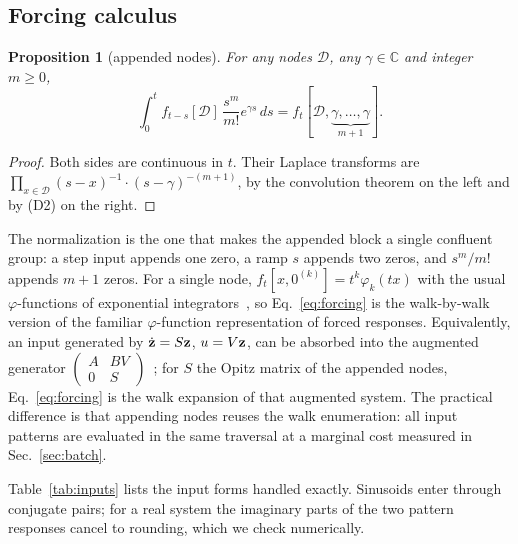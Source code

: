 \documentclass[aps,pra,superscriptaddress,floatfix,longbibliography,twocolumn]{revtex4-2}
\newcommand{\bz}{{\bf z}}
\newtheorem{proposition}{Proposition}
\begin{document}
\subsection{Forcing calculus}
\begin{proposition}[appended nodes]\label{prop:forcing}
For any nodes $\mathcal{D}$, any $\gamma\in\mathbb{C}$ and integer $m\ge0$,
\begin{equation}\label{eq:forcing}
\int_0^t f_{t-s}[\mathcal{D}]\,\frac{s^m}{m!}e^{\gamma s}\,ds=f_t[\mathcal{D},\underbrace{\gamma,\dots,\gamma}_{m+1}].
\end{equation}
\end{proposition}
\begin{proof}
Both sides are continuous in $t$. Their Laplace transforms are $\prod_{x\in\mathcal{D}}(s-x)^{-1}\cdot(s-\gamma)^{-(m+1)}$, by the convolution theorem on the left and by (D2) on the right.
\end{proof}
The normalization is the one that makes the appended block a single confluent group: a step input appends one zero, a ramp $s$ appends two zeros, and $s^m/m!$ appends $m+1$ zeros. For a single node, $f_t[x,0^{(k)}]=t^k\varphi_k(tx)$ with the usual $\varphi$-functions of exponential integrators~\cite{hochbruck2010,niesen2012}, so Eq.~\eqref{eq:forcing} is the walk-by-walk version of the familiar $\varphi$-function representation of forced responses. Equivalently, an input generated by $\dot\bz=S\bz$, $u=V\bz$, can be absorbed into the augmented generator $\left(\begin{smallmatrix}A&BV\\0&S\end{smallmatrix}\right)$~\cite{vanloan1978,almohy2011}; for $S$ the Opitz matrix of the appended nodes, Eq.~\eqref{eq:forcing} is the walk expansion of that augmented system. The practical difference is that appending nodes reuses the walk enumeration: all input patterns are evaluated in the same traversal at a marginal cost measured in Sec.~\ref{sec:batch}.

Table~\ref{tab:inputs} lists the input forms handled exactly. Sinusoids enter through conjugate pairs; for a real system the imaginary parts of the two pattern responses cancel to rounding, which we check numerically.
\end{document}
